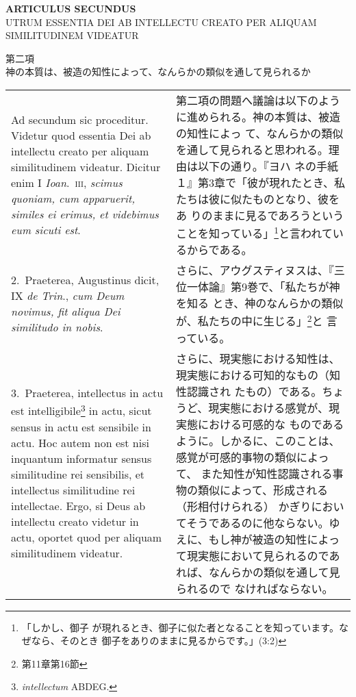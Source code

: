 \documentclass[10pt]{jsarticle} %
\begin{document}
\newpage
{}

\begin{center}
{\Large {\bf ARTICULUS SECUNDUS}}\\
{\large UTRUM ESSENTIA DEI AB INTELLECTU CREATO PER ALIQUAM
 SIMILITUDINEM VIDEATUR} 

{\large 第二項\\
神の本質は、被造の知性によって、なんらかの類似を通して見られるか}
\end{center}

\begin{longtable}{p{21em}p{21em}}
{\sc Ad secundum sic proceditur}. Videtur quod essentia Dei ab
 intellectu creato per aliquam similitudinem videatur. Dicitur enim I
 {\itshape Ioan}.~{\scshape iii}, {\it scimus quoniam, cum apparuerit,
 similes ei erimus, et videbimus eum sicuti est}.

&

第二項の問題へ議論は以下のように進められる。神の本質は、被造の知性によっ
て、なんらかの類似を通して見られると思われる。理由は以下の通り。『ヨハ
ネの手紙１』第3章で「彼が現れたとき、私たちは彼に似たものとなり、彼をあ
りのままに見るであろうということを知っている」\footnote{「しかし、御子
が現れるとき、御子に似た者となることを知っています。なぜなら、そのとき
御子をありのままに見るからです。」(3:2) }と言われているからである。

\\

2.~{\sc  Praeterea}, Augustinus dicit, IX {\it de Trin}., {\it cum
Deum novimus, fit aliqua Dei similitudo in nobis}.

&

さらに、アウグスティヌスは、『三位一体論』第9巻で、「私たちが神を知る
とき、神のなんらかの類似が、私たちの中に生じる」\footnote{第11章第16節}と
言っている。

\\

3.~{\sc Praeterea}, intellectus in actu est
intelligibile\footnote{{\it intellectum} ABDEG.} in actu, sicut sensus
in actu est sensibile in actu. Hoc autem non est nisi inquantum
informatur sensus similitudine rei sensibilis, et intellectus
similitudine rei intellectae. Ergo, si Deus ab intellectu creato
videtur in actu, oportet quod per aliquam similitudinem videatur.

&

さらに、現実態における知性は、現実態における可知的なもの（知性認識され
たもの）である。ちょうど、現実態における感覚が、現実態における可感的な
ものであるように。しかるに、このことは、感覚が可感的事物の類似によって、
また知性が知性認識される事物の類似によって、形成される（形相付けられる）
かぎりにおいてそうであるのに他ならない。ゆえに、もし神が被造の知性によっ
て現実態において見られるのであれば、なんらかの類似を通して見られるので
なければならない。


\end{longtable}
\end{document}
